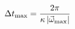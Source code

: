 \documentclass[preview]{standalone}
\begin{document}
\begin{varwidth}{50in}
  \begin{equation}
    {\Delta t}_{\rm max} = \frac{2\pi}{\kappa
    \left|\vec{\omega}_{\rm max} \right|} 
    \nonumber
  \end{equation}
\end{varwidth}
\end{document}
